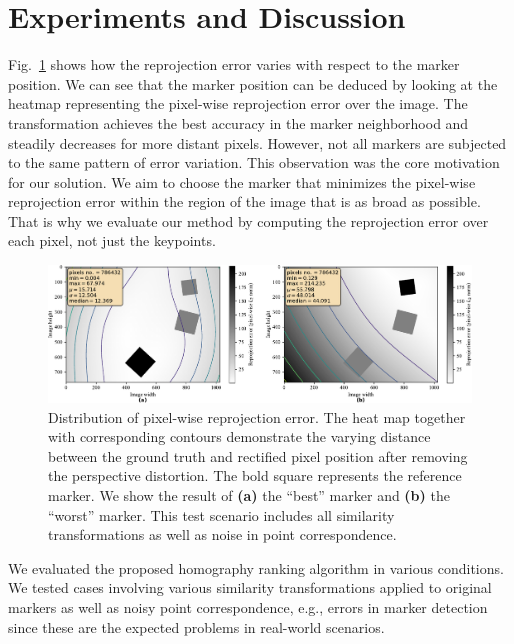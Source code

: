 \section{Experiments and Discussion}
\label{sec:HomographyExperiments}

Fig.~\ref{fig:HeatmapsBestWorst} shows how the reprojection error varies with respect to the marker position. We can see that the marker position can be deduced by looking at the heatmap representing the pixel-wise reprojection error over the image. The transformation achieves the best accuracy in the marker neighborhood and steadily decreases for more distant pixels. However, not all markers are subjected to the same pattern of error variation. This observation was the core motivation for our solution. We aim to choose the marker that minimizes the pixel-wise reprojection error within the region of the image that is as broad as possible. That is why we evaluate our method by computing the reprojection error over each pixel, not just the keypoints.

\begin{figure}[t]
    \centerline{\includegraphics[width=\linewidth]{figures/homography/heatmaps_best_worst.pdf}}
    \caption[Homography ranking heatmaps]{Distribution of pixel-wise reprojection error. The heat map together with corresponding contours demonstrate the varying distance between the ground truth and rectified pixel position after removing the perspective distortion. The bold square represents the reference marker. We show the result of \textbf{(a)} the ``best'' marker and \textbf{(b)} the ``worst'' marker. This test scenario includes all similarity transformations as well as noise in point correspondence.}
    \label{fig:HeatmapsBestWorst}
\end{figure}

We evaluated the proposed homography ranking algorithm in various conditions. We tested cases involving various similarity transformations applied to original markers as well as noisy point correspondence, e.g., errors in marker detection since these are the expected problems in real-world scenarios.

